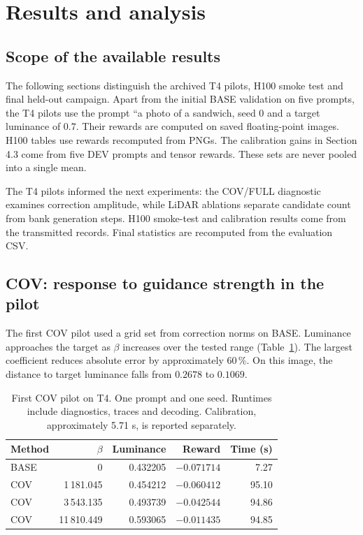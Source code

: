 \documentclass[11pt,a4paper]{article}
\begin{document}
\section{Results and analysis}
\subsection{Scope of the available results}
The following sections distinguish the archived T4 pilots, H100 smoke test and final held-out campaign. Apart from the initial BASE validation on five prompts, the T4 pilots use the prompt ``a photo of a sandwich, seed 0 and a target luminance of $0.7$. Their rewards are computed on saved floating-point images. H100 tables use rewards recomputed from PNGs. The calibration gains in Section 4.3 come from five DEV prompts and tensor rewards. These sets are never pooled into a single mean.

The T4 pilots informed the next experiments: the COV/FULL diagnostic examines correction amplitude, while LiDAR ablations separate candidate count from bank generation steps. H100 smoke-test and calibration results come from the transmitted records. Final statistics are recomputed from the evaluation CSV.

\subsection{COV: response to guidance strength in the pilot}
The first COV pilot used a grid set from correction norms on BASE. Luminance approaches the target as $\beta$ increases over the tested range (Table~\ref{tab:covinitial}). The largest coefficient reduces absolute error by approximately 60\,\%. On this image, the distance to target luminance falls from $0.2678$ to $0.1069$.
\begin{table}[htbp]
\centering\small
\begin{tabular}{lrrrr}
\toprule
Method & $\beta$ & Luminance & Reward & Time (s)\\
\midrule
BASE & 0 & 0.432205 & $-0.071714$ & 7.27\\
COV & 1\,181.045 & 0.454212 & $-0.060412$ & 95.10\\
COV & 3\,543.135 & 0.493739 & $-0.042544$ & 94.86\\
COV & 11\,810.449 & 0.593065 & $-0.011435$ & 94.85\\
\bottomrule
\end{tabular}
\caption{First COV pilot on T4. One prompt and one seed. Runtimes include diagnostics, traces and decoding. Calibration, approximately 5.71 s, is reported separately.}
\label{tab:covinitial}
\end{table}
\end{document}
